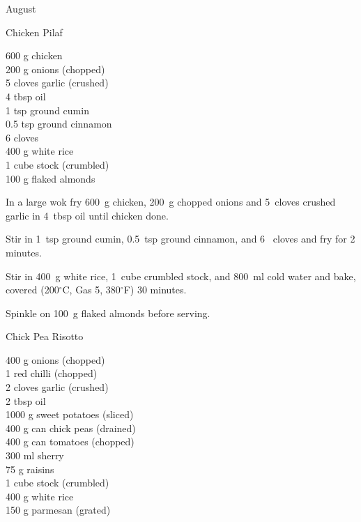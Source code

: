 \begin{menu}{August}
    \begin{recipe}{2}{Chicken Pilaf}%
		\begin{ingredients}
		600 g chicken  \\
	200 g onions (chopped) \\
	5 cloves garlic (crushed) \\
	4 tbsp oil  \\
	1 tsp ground cumin  \\
	0.5 tsp ground cinnamon  \\
	6  cloves  \\
	400 g white rice  \\
	1 cube stock (crumbled) \\
	100 g flaked almonds  \\
	
		\end{ingredients}
	
	
    \begin{instructions}
    \item 
        In a large wok fry
        600~g  chicken,
        200~g chopped onions
        and
        5~cloves crushed garlic
        in
        4~tbsp  oil
        until chicken done.
      \item 
        Stir in
        1~tsp  ground cumin,
        0.5~tsp  ground cinnamon,
        and
        6~  cloves
        and fry for 2 minutes.
      \item 
        Stir in
        400~g  white rice,
        1~cube crumbled stock,
        and
        800~ml  cold water
        and bake, covered (200$^{\circ}$C, Gas 5, 380$^{\circ}$F) 30 minutes.
      \item 
        Spinkle on
        100~g  flaked almonds
        before serving.
      
    \end{instructions}
    \end{recipe}%
  
    \begin{recipe}{2}{Chick Pea Risotto}%
		\begin{ingredients}
		400 g onions (chopped) \\
	1  red chilli (chopped) \\
	2 cloves garlic (crushed) \\
	2 tbsp oil  \\
	1000 g sweet potatoes (sliced) \\
	400 g can chick peas (drained) \\
	400 g can tomatoes (chopped) \\
	300 ml sherry  \\
	75 g raisins  \\
	1 cube stock (crumbled) \\
	400 g white rice  \\
	150 g parmesan (grated) \\
	

\end{ingredients}
\end{recipe}
\end{menu}
